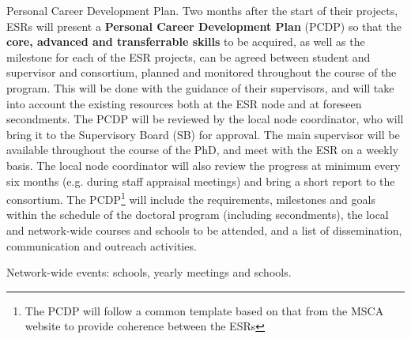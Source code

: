 
\noindent \color{blue}Personal Career Development Plan. \color{black}
Two months after the start of their projects, ESRs will present a \textbf{Personal Career Development Plan} (PCDP) so that the \textbf{core, advanced and transferrable skills} to be acquired, as well as the milestone for each of the ESR projects, can be agreed between student and supervisor and consortium, planned and monitored throughout the course of the program. 
This will be done with the guidance of their supervisors, and will take into account the existing resources both at the ESR node and at foreseen secondments. The PCDP will be reviewed by the local node coordinator, who will bring it to the Supervisory Board (SB) for approval. The main supervisor will be available throughout the course of the PhD, and meet with the ESR on a weekly basis. 
The local node coordinator will also review the progress at minimum every six months (e.g. during staff appraisal meetings) and bring a short report to the consortium. 
The PCDP\footnote{The \acronym PCDP will follow a common template based on that from the MSCA website to provide coherence between the ESRs} will include the requirements, milestones and goals within the schedule of the doctoral program (including secondments), the local and network-wide courses and schools to be attended, and a list of dissemination, communication and outreach activities. 




\noindent \color{blue}Network-wide events: schools, yearly meetings and schools. \color{black}

